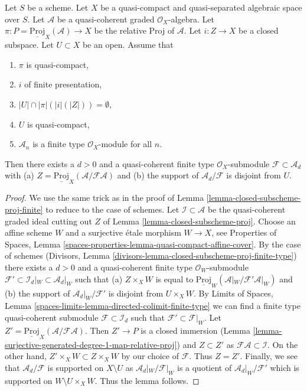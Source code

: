 \begin{lemma}
\label{lemma-closed-subscheme-proj-finite-type}
Let $S$ be a scheme. Let $X$ be a quasi-compact and quasi-separated
algebraic space over $S$.
Let $\mathcal{A}$ be a quasi-coherent graded $\mathcal{O}_X$-algebra.
Let $\pi : P = \underline{\text{Proj}}_X(\mathcal{A}) \to X$ be the relative
Proj of $\mathcal{A}$. Let $i : Z \to X$ be a closed subspace.
Let $U \subset X$ be an open. Assume that
\begin{enumerate}
\item $\pi$ is quasi-compact,
\item $i$ of finite presentation,
\item $|U| \cap |\pi|(|i|(|Z|)) = \emptyset$,
\item $U$ is quasi-compact,
\item $\mathcal{A}_n$ is a finite type $\mathcal{O}_X$-module for all $n$.
\end{enumerate}
Then there exists a $d > 0$ and a quasi-coherent finite type
$\mathcal{O}_X$-submodule $\mathcal{F} \subset \mathcal{A}_d$ with (a)
$Z = \underline{\text{Proj}}_X(\mathcal{A}/\mathcal{F}\mathcal{A})$
and (b) the support of $\mathcal{A}_d/\mathcal{F}$ is disjoint from $U$.
\end{lemma}

\begin{proof}
We use the same trick as in the proof of
Lemma \ref{lemma-closed-subscheme-proj-finite}
to reduce to the case of schemes.
Let $\mathcal{I} \subset \mathcal{A}$ be the quasi-coherent graded
ideal cutting out $Z$ of Lemma \ref{lemma-closed-subscheme-proj}.
Choose an affine scheme $W$ and a surjective \'etale morphism
$W \to X$, see Properties of Spaces, Lemma
\ref{spaces-properties-lemma-quasi-compact-affine-cover}.
By the case of schemes
(Divisors, Lemma \ref{divisors-lemma-closed-subscheme-proj-finite-type})
there exists a $d > 0$ and a quasi-coherent finite type
$\mathcal{O}_W$-submodule
$\mathcal{F}' \subset \mathcal{I}_d|_W \subset \mathcal{A}_d|_W$
such that (a) $Z \times_X W$ is equal to
$\underline{\text{Proj}}_W(\mathcal{A}|_W/\mathcal{F}'\mathcal{A}|_W)$
and (b) the support of $\mathcal{A}_d|_W/\mathcal{F}'$ is disjoint from
$U \times_X W$. By Limits of Spaces, Lemma
\ref{spaces-limits-lemma-directed-colimit-finite-type}
we can find a finite type quasi-coherent submodule
$\mathcal{F} \subset \mathcal{I}_d$ such that
$\mathcal{F}' \subset \mathcal{F}|_W$. Let
$Z' = \underline{\text{Proj}}_X(\mathcal{A}/\mathcal{F}\mathcal{A})$.
Then $Z' \to P$ is a closed immersion
(Lemma \ref{lemma-surjective-generated-degree-1-map-relative-proj})
and $Z \subset Z'$ as $\mathcal{F}\mathcal{A} \subset \mathcal{I}$.
On the other hand, $Z' \times_X W \subset Z \times_X W$ by our
choice of $\mathcal{F}$. Thus $Z = Z'$.
Finally, we see that $\mathcal{A}_d/\mathcal{F}$ is supported on
$X \setminus U$ as $\mathcal{A}_d|_W/\mathcal{F}|_W$ is a quotient
of $\mathcal{A}_d|_W/\mathcal{F}'$ which is supported on
$W \setminus U \times_X W$. Thus the lemma follows.
\end{proof}

